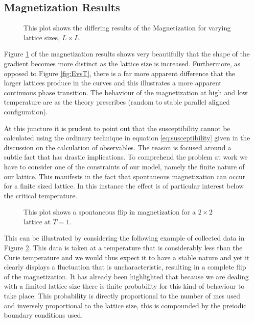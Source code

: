\documentclass[a4paper]{article}
\begin{document}
\subsection{Magnetization Results}\label{sec:magn-results}

\begin{figure}[htb]
  \centering
{}
  \caption[hjsgd]{This plot shows the differing results of the
    Magnetization for varying lattice
    sizes, $L\times L$.} \label{fig:MvsT}
\end{figure}
Figure \ref{fig:MvsT} of the magnetization results shows very beautifully
that the shape of the gradient becomes more distinct as the lattice
size is increased. Furthermore, as opposed to Figure \ref{fig:EvsT},
there is a far more apparent difference that the larger lattices produce
in the curves and this illustrates a more apparent continuous phase
transition. The behaviour of the magnetization at high and low
temperature are as the theory prescribes (random to stable parallel
aligned configuration).

At this juncture it is prudent to point out that the susceptibility cannot
be calculated using the ordinary technique in equation
\eqref{eq:susceptibility} given in the discussion on the calculation of
observables. The reason is focused around a subtle fact that has
drastic implications. To comprehend the problem
at work we have to consider one of the constraints of our model,
namely the finite nature of our lattice. This manifests in the fact
that spontaneous magnetization can occur for a finite sized lattice. In
this instance the effect is of particular interest below the critical
temperature. 


\begin{figure}[htb]
  \centering
  \caption{This plot shows a spontaneous flip in magnetization for a
    $2\times 2$ lattice at $T=1$.} \label{fig:sponmag}
\end{figure}
This can be illustrated by considering the following example of
collected data in Figure \ref{fig:sponmag}.
This data is taken at a temperature that is considerably less than the 
Curie temperature and we would thus expect it to have a stable nature
and yet it clearly displays a fluctuation that is uncharacteristic, resulting in a complete
flip of the magnetization. It has already
been highlighted that because we are dealing with a limited lattice
size there is finite probability for this kind of behaviour to take
place. This probability is directly proportional to the number of mcs used and
inversely proportional to the lattice size, this is compounded by the preiodic boundary conditions used. 
\end{document}
